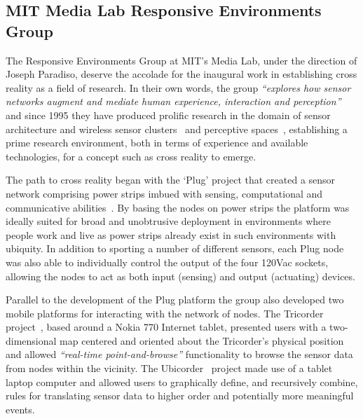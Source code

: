 \subsection{MIT Media Lab Responsive Environments Group}
\label{subsec:responsive_environments_at_mit_media_lab}
The Responsive Environments Group at MIT's Media Lab, under the direction of Joseph Paradiso, deserve the accolade for the inaugural work in establishing cross reality as a field of research. In their own words, the group \textit{``explores how sensor networks augment and mediate human experience, interaction and perception''}~\cite{ResponsiveEnvironmentsGroup} and since 1995 they have produced prolific research in the domain of sensor architecture and wireless sensor clusters~\cite{Paradiso1996, Rowe1999, Burke1996, Paradiso1997, Knaian2000, Teegarden2001, A2007, Ma2002, Bamberg2008, Laibowitz2005, LaPenta2007} and perceptive spaces~\cite{Lifton2001, Paradiso1997a, Paradiso2000, Richardson2004}, establishing a prime research environment, both in terms of experience and available technologies, for a concept such as cross reality to emerge.

The path to cross reality began with the `Plug' project that created a sensor network comprising power strips imbued with sensing, computational and communicative abilities~\cite{Lifton2007b}. By basing the nodes on power strips the platform was ideally suited for broad and unobtrusive deployment in environments where people work and live as power strips already exist in such environments with ubiquity. In addition to sporting a number of different sensors, each Plug node was also able to individually control the output of the four 120Vac sockets, allowing the nodes to act as both input (sensing) and output (actuating) devices.

Parallel to the development of the Plug platform the group also developed two mobile platforms for interacting with the network of nodes. The Tricorder project~\cite{Lifton2007}, based around a Nokia 770 Internet tablet, presented users with a two-dimensional map centered and oriented about the Tricorder's physical position and allowed \textit{``real-time point-and-browse''} functionality to browse the sensor data from nodes within the vicinity. The Ubicorder~\cite{Mittal2011} project made use of a tablet laptop computer and allowed users to graphically define, and recursively combine, rules for translating sensor data to higher order and potentially more meaningful events.

